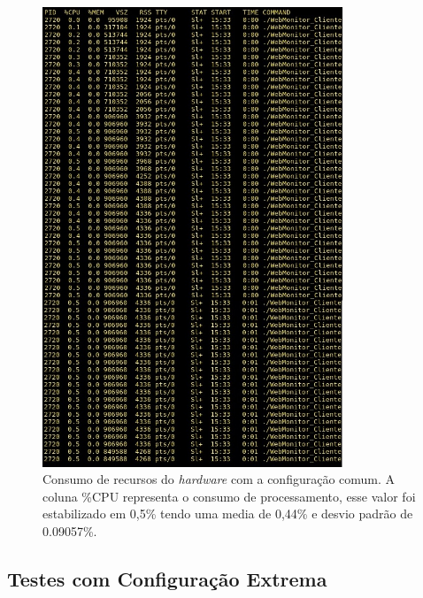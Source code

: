 \begin{figure}[H]
	\centering
	\includegraphics[width=0.8\textwidth]{figuras/monitorWebCliTeste1/hardware.JPG}
	\caption[Consumo de recursos do \textit{hardware} com a configuração comum.]{Consumo de recursos do \textit{hardware} com a configuração comum. A coluna \%CPU representa o consumo de processamento, esse valor foi estabilizado em 0,5\% tendo uma media de 0,44\% e desvio padrão de 0.09057\%.}
	\label{Img:ConsumoDoSistema}
\end{figure}




\subsection{Testes com Configuração Extrema} \label{subsec:QuantidadeRequisicoesMaiores}

